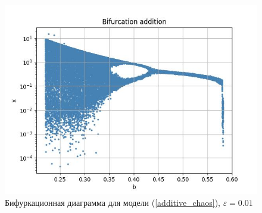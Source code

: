         \begin{figure}
            \centering
            \includegraphics[width=\textwidth]{stochastic/images/bifurcation_x_0_2_a_1_compare_additional_noise.jpg}
        
            \captionsetup{justification=centering}
            \caption{Бифуркационная диаграмма для модели (\ref{additive_chaos}), \(\varepsilon = 0.01\)}
            \label{bifurcation_x_0_2_a_1_compare_additional_noise}
        \end{figure}